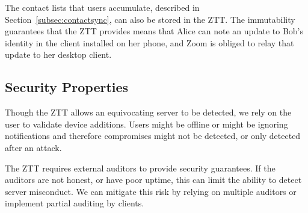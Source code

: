 The contact lists that users accumulate, described in Section~\ref{subsec:contactsync}, can also be
stored in the ZTT. The immutability guarantees that the ZTT provides means that Alice can note an
update to Bob's identity in the client installed on her phone, and Zoom is obliged to relay that
update to her desktop client.

\subsection{Security Properties}

Though the ZTT allows an equivocating server to be detected, we rely on the user to validate device
additions. Users might be offline or might be ignoring notifications and therefore compromises might
not be detected, or only detected after an attack.

The ZTT requires external auditors to provide security guarantees. If the auditors are not honest,
or have poor uptime, this can limit the ability to detect server misconduct. We can mitigate this
risk by relying on multiple auditors or implement partial auditing by clients.
